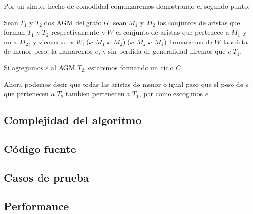 Por un simple hecho de comodidad comenzaremos demostrando el segundo punto:

Sean $T_1$ y $T_2$ dos AGM del grafo $G$, sean $M_1$ y $M_2$ los conjuntos de aristas que forman $T_1$ y $T_2$ respectivamente y $W$ el conjunto de aristas que pertenece a $M_1$ y no a $M_2$, y viceversa. \forall $x$ \in $W$, ($x$ \in $M_1$ \wedge $x$ \nin $M_2$) \vee ($x$ \in $M_2$ \wedge $x$ \in $M_1$)
Tomaremos de $W$ la arista de menor peso, la llamaremos $e$, y sin perdida de generalidad diremos que $e$ \in $T_1$.


Si agregamos $e$ al AGM $T_2$, estaremos formando un ciclo $C$

Ahora podemos decir que todas las aristas de menor o igual peso que el peso de $e$ que pertenecen a $T_2$ tambien pertenecen a $T_1$, por como escogimos $e$

\subsection{Complejidad del algoritmo}


\subsection{C\'odigo fuente}


\subsection{Casos de prueba}


\subsection{Performance}


